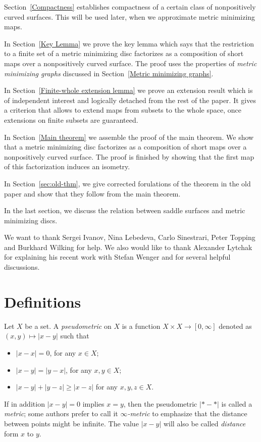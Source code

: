 \documentclass{article}
\begin{document}
Section~\ref{Compactness} establishes compactness of a certain class of nonpositively curved surfaces.
This will be used later, when we approximate metric minimizing maps.
 
In Section~\ref{Key Lemma} we prove the key lemma which says that the restriction to a finite set of
a metric minimizing disc factorizes as a composition of short maps over a nonpositively curved surface.
The proof uses the properties of \emph{metric minimizing graphs} discussed in Section~\ref{Metric minimizing graphs}.
 
In Section~\ref{Finite-whole extension lemma} we prove an extension result which is of independent interest and logically detached
from the rest of the paper.
It gives a criterion that allows to extend maps from subsets
to the whole space, once extensions on finite subsets are guaranteed.
 
In Section~\ref{Main theorem} we assemble the proof of the main theorem.
We show that a metric minimizing disc factorizes as a composition of short maps over a
nonpositively curved surface.
The proof is finished by showing that the first map of this factorization
induces an isometry.

In Section~\ref{sec:old-thm}, we give corrected forulations of the theorem in the old paper and show that they follow from the main theorem.

In the last section, we discuss the relation between saddle surfaces and metric minimizing discs.

We want to thank 
Sergei Ivanov, 
Nina Lebedeva,
Carlo Sinestrari, 
Peter Topping 
and Burkhard Wilking 
for help.
We also would like to thank Alexander Lytchak for explaining his recent work with Stefan Wenger and for several helpful discussions.


\section{Definitions}
\label{sec:defs}

Let $X$ be a set.
A \emph{pseudometric} on $X$ 
is a function $X\times X\to[0,\infty]$ denoted as $(x,y)\mapsto |x-y|$
such that 
\begin{itemize}
\item $|x-x|=0$, for any $x\in X$;
\item $|x-y|=|y-x|$, for any $x,y\in X$;
\item $|x-y|+|y-z|\ge|x-z|$ for any  $x,y,z\in X$.
\end{itemize}
If in addition $|x-y|=0$ implies $x=y$, then the pseudometric $|{*}-{*}|$ is called a \emph{metric}; some authors prefer to call it \emph{$\infty$-metric} to emphasize that the distance between points might be infinite.
The value $|x-y|$ will also be called \emph{distance} form $x$ to $y$.
\end{document}
